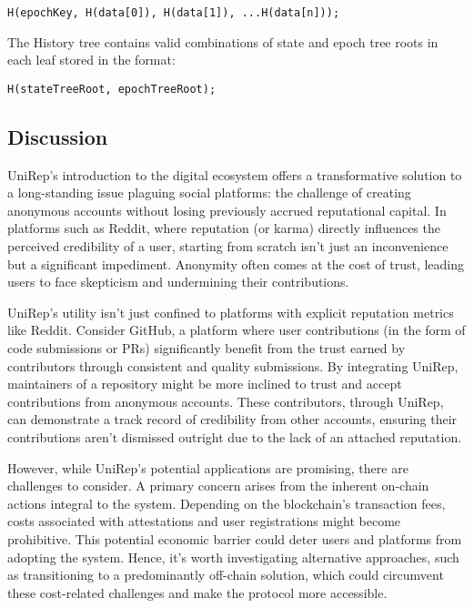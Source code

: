 \documentclass[11pt]{article}
\begin{document}
\begin{verbatim}
H(epochKey, H(data[0]), H(data[1]), ...H(data[n]));
\end{verbatim}

The History tree contains valid combinations of state and epoch tree roots in each leaf stored in the format:

\begin{verbatim}
H(stateTreeRoot, epochTreeRoot);
\end{verbatim}
\subsection{Discussion}
\label{sec:org0649e8e}

UniRep's introduction to the digital ecosystem offers a transformative solution to a long-standing issue plaguing social platforms: the challenge of creating anonymous accounts without losing previously accrued reputational capital. In platforms such as Reddit, where reputation (or karma) directly influences the perceived credibility of a user, starting from scratch isn't just an inconvenience but a significant impediment. Anonymity often comes at the cost of trust, leading users to face skepticism and undermining their contributions.

UniRep's utility isn't just confined to platforms with explicit reputation metrics like Reddit. Consider GitHub, a platform where user contributions (in the form of code submissions or PRs) significantly benefit from the trust earned by contributors through consistent and quality submissions. By integrating UniRep, maintainers of a repository might be more inclined to trust and accept contributions from anonymous accounts. These contributors, through UniRep, can demonstrate a track record of credibility from other accounts, ensuring their contributions aren't dismissed outright due to the lack of an attached reputation.

However, while UniRep's potential applications are promising, there are challenges to consider. A primary concern arises from the inherent on-chain actions integral to the system. Depending on the blockchain's transaction fees, costs associated with attestations and user registrations might become prohibitive. This potential economic barrier could deter users and platforms from adopting the system. Hence, it's worth investigating alternative approaches, such as transitioning to a predominantly off-chain solution, which could circumvent these cost-related challenges and make the protocol more accessible.
\end{document}
